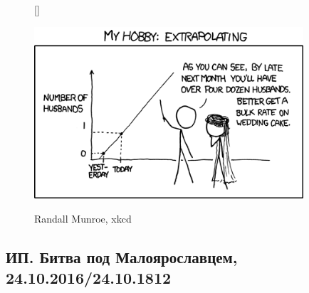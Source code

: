 \documentclass[12pt, a4paper]{article}
\begin{document}
\begin{figure}[h!]
[\FBwidth]
{\caption*{Randall Munroe, xkcd}}
{\includegraphics[width=10cm]{figures/extrapolating.png}}
\end{figure}

\subsection{ИП. Битва под Малоярославцем, 24.10.2016/24.10.1812}
\end{document}
